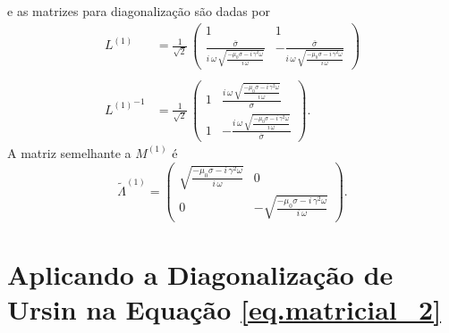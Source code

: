 e as matrizes para diagonaliza\c{c}\~ao s\~ao dadas por
\begingroup
\Large
\begin{align*}
L^{(1)}&=\frac{1}{\sqrt{2}}\,
\begin{pmatrix}
1&1\\
\frac{\overline{\sigma}}{i\,\omega\,\sqrt{\frac{-\mu_0\sigma-i\,\gamma^2\omega}{i\,\omega}}}&-\frac{\overline{\sigma}}{i\,\omega\,\sqrt{\frac{-\mu_0\sigma-i\,\gamma^2\omega}{i\,\omega}}}
\end{pmatrix}\\\\
{L^{(1)}}^{-1}&=\frac{1}{\sqrt{2}}\,
\begin{pmatrix}
1&\frac{i\,\omega\,\sqrt{\frac{-\mu_0\sigma-i\,\gamma^2\omega}{i\,\omega}}}{\overline{\sigma}}\\
1&-\frac{i\,\omega\,\sqrt{\frac{-\mu_0\sigma-i\,\gamma^2\omega}{i\,\omega}}}{\overline{\sigma}}
\end{pmatrix}.
\end{align*}
\endgroup
A matriz semelhante a $M^{(1)}$ \'e
\begin{equation*}
\tilde{\Lambda}^{(1)}=
\begin{pmatrix}
\sqrt{\frac{-\mu_0\sigma-i\,\gamma^2\omega}{i\,\omega}}&0\\
0&-\sqrt{\frac{-\mu_0\sigma-i\,\gamma^2\omega}{i\,\omega}}
\end{pmatrix}.
\end{equation*}

\section{Aplicando a Diagonaliza\c{c}\~ao de Ursin na Equa\c{c}\~ao \ref{eq.matricial_2}}\label{sec.diagonalizacao_2}

